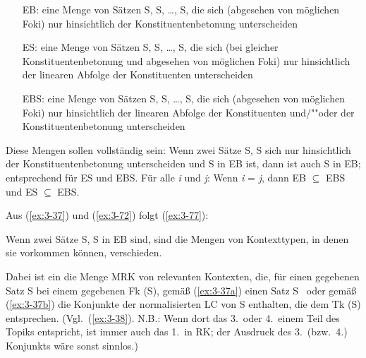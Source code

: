 \documentclass[output=paper]{langsci/langscibook}
\begin{document}
\begin{exe}
\ex 
\begin{xlist}
	\ex \label{ex:3-76a}
\begin{itemize}
	\item[EB\sub{\textit{i}}:] eine Menge von Sätzen S, S, \ldots,
	S, die sich (abgesehen von möglichen Foki) nur hinsichtlich
	der Konstituentenbetonung unterscheiden
\end{itemize}
\ex \label{ex:3-76b}
\begin{itemize}
	\item[ES\sub{\textit{i}}:] eine Menge von Sätzen S, S, \ldots,
S, die sich (bei gleicher Konstituentenbetonung und
abgesehen von möglichen Foki) nur hinsichtlich der linearen Abfolge
der Konstituenten unterscheiden
\end{itemize}
\ex \label{ex:3-76c}
\begin{itemize}
\setlength{\itemindent}{1ex}
\item[EBS\sub{\textit{i}}:] eine Menge von Sätzen S, S, \ldots,
S, die sich (abgesehen von möglichen Foki) nur hinsichtlich
der linearen Abfolge der Konstituenten und/""oder der
Konstituentenbetonung unterscheiden
\end{itemize}
\end{xlist}
\end{exe}
\addlines
Diese Mengen sollen vollständig sein: Wenn zwei Sätze S, S
sich nur hinsichtlich der Konstituentenbetonung unterscheiden und
S in EB ist, dann ist auch S in EB; entsprechend für
ES und EBS. Für alle \textit{i} und \textit{j}: Wenn \textit{i} = \textit{j}, dann EB
$\subseteq$ EBS und ES $\subseteq$ EBS.

Aus (\ref{ex:3-37}) und (\ref{ex:3-72}) folgt (\ref{ex:3-77}):
\begin{exe}
\ex
\label{ex:3-77}
Wenn zwei Sätze S, S in EB sind, sind die Mengen von
Kontexttypen, in denen sie vorkommen können, verschieden.
\end{exe}
Dabei ist ein  die Menge MRK von relevanten
Kontexten, die, für einen gegebenen Satz S bei einem gegebenen Fk
(S), gemäß (\ref{ex:3-37a}) einen Satz S \ oder gemäß (\ref{ex:3-37b}) die
Konjunkte der normalisierten LC von S enthalten, die dem Tk (S)
entsprechen. (Vgl.\ (\ref{ex:3-38}). N.B.: Wenn dort \zb das 3.\ oder
4.\, einem Teil des Topiks entspricht, ist immer auch das
1.\, in RK; der Ausdruck des 3.\ (bzw.\ 4.) Konjunkts wäre sonst
  sinnlos.)
\end{document}
